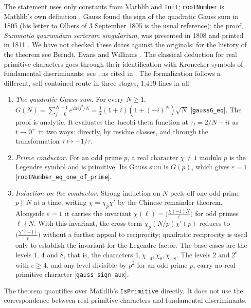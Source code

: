 \documentclass[11pt]{article}
\theoremstyle{definition}
\newcommand{\lean}[1]{\texttt{#1}}
\begin{document}
\noindent
The statement uses only constants from Mathlib and \lean{Init}; \lean{rootNumber} is Mathlib's own definition \cite[REVIEW\_GAUSS\_SIGN\_AND\_OAI \S A.3]{bbrecords}. Gauss found the sign of the quadratic Gauss sum in 1805 (his letter to Olbers of 3 September 1805 is the usual reference); the proof, \emph{Summatio quarumdam serierum singularium}, was presented in 1808 and printed in 1811 \cite{Gauss1811}. We have not checked these dates against the originals; for the history of the theorem see Berndt, Evans and Williams \cite{BEW1998}. The classical deduction for real primitive characters goes through their identification with Kronecker symbols of fundamental discriminants; see \cite[Theorems 9.13, 9.16]{MontgomeryVaughan2006}, as cited in \cite[Lemma 2.9]{FGMPS2026}. The formalization follows a different, self-contained route in three stages, 1,419 lines in all:
\begin{enumerate}[label=S\arabic*.]
\item \emph{The quadratic Gauss sum.} For every $N \ge 1$, $G(N) = \sum_{j=0}^{N-1}e^{2\pi ij^2/N} = \tfrac12(1+i)(1+(-i)^N)\sqrt N$ [\lean{gaussG\_\allowbreak{}eq}]. The proof is analytic. It evaluates the Jacobi theta function at $\tau_t = 2/N + it$ as $t \to 0^+$ in two ways: directly, by residue classes, and through the transformation $\tau \mapsto -1/\tau$.
\item \emph{Prime conductor.} For an odd prime $p$, a real character $\chi \ne 1$ modulo $p$ is the Legendre symbol and is primitive. Its Gauss sum is $G(p)$, which gives $\varepsilon = 1$ [\lean{rootNumber\_\allowbreak{}eq\_\allowbreak{}one\_\allowbreak{}of\_\allowbreak{}prime}].
\item \emph{Induction on the conductor.} Strong induction on $N$ peels off one odd prime $p \parallel N$ at a time, writing $\chi = \chi_p\chi'$ by the Chinese remainder theorem. Alongside $\varepsilon = 1$ it carries the invariant $\chi(\ell) = \bigl(\tfrac{\chi(-1)N}{\ell}\bigr)$ for odd primes $\ell \nmid N$. With this invariant, the cross term $\chi_p(N/p)\chi'(p)$ reduces to $\bigl(\tfrac{\chi'(-1)}{p}\bigr)$ without a further appeal to reciprocity; quadratic reciprocity is used only to establish the invariant for the Legendre factor. The base cases are the levels $1$, $4$ and $8$, that is, the characters $1, \chi_{-4}, \chi_8, \chi_{-8}$. The levels $2$ and $2^e$ with $e \ge 4$, and any level divisible by $p^2$ for an odd prime $p$, carry no real primitive character [\lean{gauss\_\allowbreak{}sign\_\allowbreak{}aux}].
\end{enumerate}
The theorem quantifies over Mathlib's \lean{IsPrimitive} directly. It does not use the correspondence between real primitive characters and fundamental discriminants.
\end{document}
